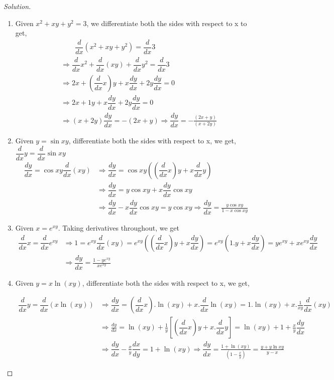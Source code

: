 \documentclass[../../main.tex]{subfiles}
\theoremstyle{definition}
\newenvironment{solution}
    {\begin{proof}[Solution]}
    {\end{proof}}
\begin{document}
\begin{solution}
\begin{enumerate}[label=(\roman*)]
\item Given $x^2+xy+y^2=3$, we differentiate both the sides with respect to x to get,
\begin{align*}
    &\qquad \dfrac{d}{dx}(x^2+xy+y^2)=\dfrac{d}{dx}3 \\
    &\Rightarrow \dfrac{d}{dx}x^2+\dfrac{d}{dx}(xy)+\dfrac{d}{dx}y^2=\dfrac{d}{dx}3 \\ &\Rightarrow 2x+(\dfrac{d}{dx}x)y+x\dfrac{dy}{dx}+2y\dfrac{dy}{dx}= 0 \\
    &\Rightarrow 2x+1y+x\dfrac{dy}{dx}+2y\dfrac{dy}{dx}= 0 \\ 
    &\Rightarrow(x+2y)\dfrac{dy}{dx}= -(2x+y) \Rightarrow\dfrac{dy}{dx}= -\frac{(2x+y)}{(x+2y)}
\end{align*}

\item Given  $y=\sin xy$, differentiate both the sides with respect to x, we get,  $\dfrac{d}{dx}y=\dfrac{d}{dx}\sin xy$ 
\begin{align*}
\dfrac{dy}{dx}=\cos xy \dfrac{d}{dx}(xy) &\Rightarrow \dfrac{dy}{dx}=\cos xy ((\dfrac{d}{dx}x)y+x\dfrac{d}{dx}y) \\
&\Rightarrow \dfrac{dy}{dx}=y\cos xy +x\dfrac{dy}{dx}\cos xy \\
&\Rightarrow \dfrac{dy}{dx}-x\dfrac{dy}{dx}\cos xy=y\cos xy \Rightarrow \dfrac{dy}{dx} = \frac{y\cos xy}{1-x\cos xy}
\end{align*}

\item Given $x=e^{xy}$. Taking derivatives throughout, we get
\begin{align*}
    \dfrac{d}{dx}x=\dfrac{d}{dx}e^{xy} &\Rightarrow 1=e^{xy}\dfrac{d}{dx}(xy)=e^{xy}((\dfrac{d}{dx}x)y+x\dfrac{dy}{dx})=e^{xy}(1.y+x\dfrac{dy}{dx})= ye^{xy}+x e^{xy}\dfrac{dy}{dx} \\
    &\Rightarrow \dfrac{dy}{dx}=\frac{1-ye^{xy}}{xe^{xy}}
\end{align*}

\item Given $y=x\ln (xy)$, differentiate both the sides with respect to x, we get,

\begin{align*}
\dfrac{d}{dx}y=\dfrac{d}{dx}(x\ln(xy)) &\Rightarrow \dfrac{dy}{dx}=(\dfrac{d}{dx}x).\ln(xy)+x.\dfrac{d}{dx}\ln(xy)=1.\ln(xy)+x.\frac{1}{xy}\dfrac{d}{dx}(xy) \\
&\Rightarrow \frac{dy}{dx} = \ln(xy)+\frac{1}{y}\left[(\dfrac{d}{dx}x)y+x.\dfrac{d}{dx}y\right] = \ln(xy)+1+\frac{x}{y}\dfrac{dy}{dx} \\
&\Rightarrow \dfrac{dy}{dx}-\frac{x}{y}\dfrac{dx}{dy}=1+\ln(xy) \Rightarrow \dfrac{dy}{dx}= \frac{1+\ln(xy)}{(1-\frac{x}{y})}=\frac{y+y\ln xy}{y-x}
\end{align*}


\end{enumerate}
\end{solution}
\end{document}
